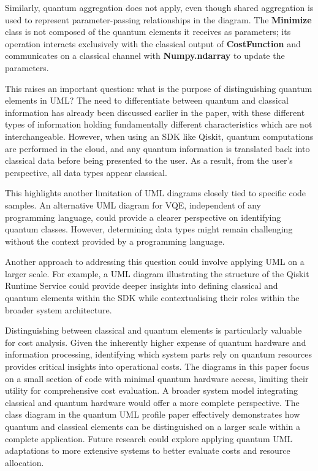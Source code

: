\documentclass{article}
\begin{document}
Similarly, quantum aggregation does not apply, even though shared aggregation is used to represent parameter-passing relationships in the diagram. The \textbf{Minimize} class is not composed of the quantum elements it receives as parameters; its operation interacts exclusively with the classical output of \textbf{CostFunction} and communicates on a classical channel with \textbf{Numpy.ndarray} to update the parameters.

This raises an important question: what is the purpose of distinguishing quantum elements in UML? The need to differentiate between quantum and classical information has already been discussed earlier in the paper, with these different types of information holding fundamentally different characteristics which are not interchangeable. However, when using an SDK like Qiskit, quantum computations are performed in the cloud, and any quantum information is translated back into classical data before being presented to the user. As a result, from the user’s perspective, all data types appear classical. 

This highlights another limitation of UML diagrams closely tied to specific code samples. An alternative UML diagram for VQE, independent of any programming language, could provide a clearer perspective on identifying quantum classes. However, determining data types might remain challenging without the context provided by a programming language.

Another approach to addressing this question could involve applying UML on a larger scale. For example, a UML diagram illustrating the structure of the Qiskit Runtime Service could provide deeper insights into defining classical and quantum elements within the SDK while contextualising their roles within the broader system architecture.

Distinguishing between classical and quantum elements is particularly valuable for cost analysis. Given the inherently higher expense of quantum hardware and information processing, identifying which system parts rely on quantum resources provides critical insights into operational costs. The diagrams in this paper focus on a small section of code with minimal quantum hardware access, limiting their utility for comprehensive cost evaluation. A broader system model integrating classical and quantum hardware would offer a more complete perspective. The class diagram in the quantum UML profile paper effectively demonstrates how quantum and classical elements can be distinguished on a larger scale within a complete application\cite{Pérez-Castillo2022}. Future research could explore applying quantum UML adaptations to more extensive systems to better evaluate costs and resource allocation.
\end{document}
